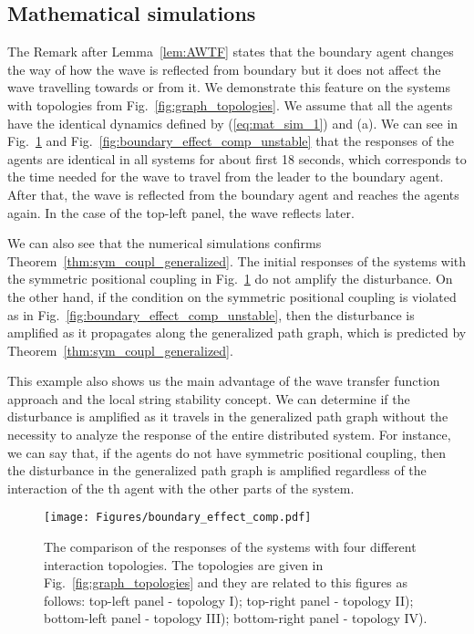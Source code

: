 \documentclass[10pt,twocolumn,twoside]{IEEEtran}
\theoremstyle{definition}
\newcommand{\revA}{Black}
\begin{document}
\subsection{Mathematical simulations}
The Remark after Lemma~\ref{lem:AWTF} states that the boundary agent changes the way of how the wave is reflected from boundary but it does not affect the wave travelling towards or from it. We demonstrate this feature on the systems with topologies from Fig.~\ref{fig:graph_topologies}. We assume that all the agents have the identical dynamics defined by (\ref{eq:mat_sim_1}) and (a). We can see in Fig.~\ref{fig:boundary_effect_comp} {\color{\revA}and Fig.~\ref{fig:boundary_effect_comp_unstable}} that the responses of the agents are identical in all systems for about first 18 seconds, which corresponds to the time needed for the wave to travel from the leader to the boundary agent. After that, the wave is reflected from the boundary agent and reaches the agents again. In the case of the top-left panel, the wave reflects later.

{\color{\revA}We can also see that the numerical simulations confirms Theorem~\ref{thm:sym_coupl_generalized}. The initial responses of the systems with the symmetric positional coupling in Fig.~\ref{fig:boundary_effect_comp} do not amplify the disturbance. On the other hand, if the condition on the symmetric positional coupling is violated as in Fig.~\ref{fig:boundary_effect_comp_unstable}, then the disturbance is amplified as it propagates along the generalized path graph, which is predicted by Theorem~\ref{thm:sym_coupl_generalized}.

This example also shows us the main advantage of the wave transfer function approach and the local string stability concept. We can determine if the disturbance is amplified as it travels in the generalized path graph without the necessity to analyze the response of the entire distributed system. For instance, we can say that, if the agents do not have symmetric positional coupling, then the disturbance in the generalized path graph is amplified regardless of the interaction of the th agent with the other parts of the system.}









\begin{figure}[ht]
 \centering
  \texttt{[image: Figures/boundary\_effect\_comp.pdf]}
  \caption{The comparison of the responses of the systems with four different interaction topologies. The topologies are given in Fig.~\ref{fig:graph_topologies} and they are related to this figures as follows: top-left panel - topology I); top-right panel - topology II); bottom-left panel - topology III); bottom-right panel - topology IV).}
  \label{fig:boundary_effect_comp}
\end{figure}
\end{document}
